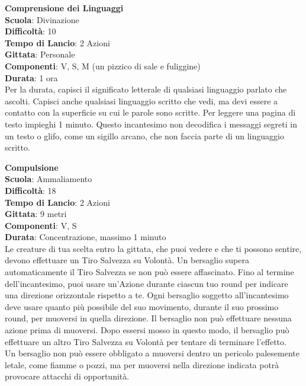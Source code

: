 \begin{multicols}{2}
\medskip\textbf{Comprensione dei Linguaggi}\\
\textbf{Scuola}: Divinazione\\
\textbf{Difficoltà}:  10\\
\textbf{Tempo di Lancio}: 2 Azioni\\
\textbf{Gittata}: Personale\\
\textbf{Componenti}: V, S, M (un pizzico di sale e fuliggine)\\
\textbf{Durata}: 1 ora\\
Per la durata, capisci il significato letterale di qualsiasi linguaggio parlato che ascolti. Capisci anche qualsiasi linguaggio scritto che vedi, ma devi essere a contatto con la superficie su cui le parole sono scritte. Per leggere una pagina di testo impieghi 1 minuto. Questo incantesimo non decodifica i messaggi segreti in un testo o glifo, come un sigillo arcano, che non faccia parte di un linguaggio scritto.

\medskip\textbf{Compulsione}\\
\textbf{Scuola}: Ammaliamento\\
\textbf{Difficoltà}:  18\\
\textbf{Tempo di Lancio}: 2 Azioni\\
\textbf{Gittata}: 9 metri\\
\textbf{Componenti}: V, S\\
\textbf{Durata}: Concentrazione, massimo 1 minuto\\
Le creature di tua scelta entro la gittata, che puoi vedere e che ti possono sentire, devono effettuare un Tiro Salvezza su Volontà. Un bersaglio supera automaticamente il Tiro Salvezza se non può essere affascinato. Fino al termine dell'incantesimo, puoi usare un'Azione durante ciascun tuo round per indicare una direzione orizzontale rispetto a te. Ogni bersaglio soggetto all'incantesimo deve usare quanto più possibile del suo movimento, durante il suo prossimo round, per muoversi in quella direzione. Il bersaglio non può effettuare nessuna azione prima di muoversi. Dopo essersi mosso in questo modo, il bersaglio può effettuare un altro Tiro Salvezza su Volontà per tentare di terminare l’effetto.\\
Un bersaglio non può essere obbligato a muoversi dentro un pericolo palesemente letale, come fiamme o pozzi, ma per muoversi nella direzione indicata potrà provocare attacchi di opportunità.


\end{multicols}
